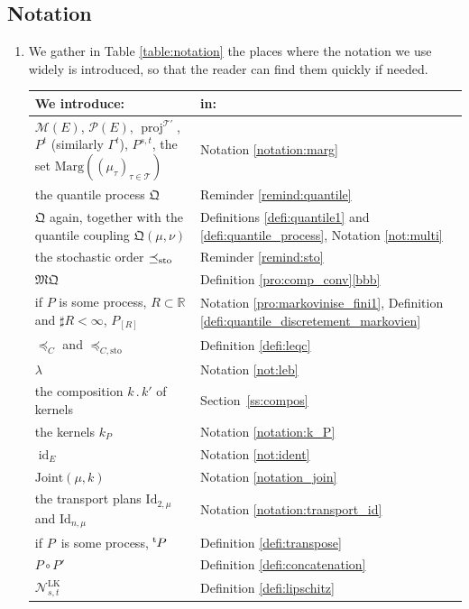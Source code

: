 \documentclass[11pt]{article}
\newcommand{\Subsection}{\subsection}
\newcommand{\ldot}{\mathbin{.}}
\theoremstyle{plain}
\theoremstyle{definition}
\newcommand{\id}{\mathrm{Id}}
\newcommand{\join}{\mathrm{Joint}}
\newcommand{\como}{\mathfrak{Q}}
\newcommand{\mq}{\mathfrak{MQ}}
\newcommand{\ML}{\mathrm{LK}}
\newcommand{\idk}{\operatorname{id}}
\newcommand{\Tt}{{\mathcal T}}
\let\mb\relax
\let\mn\relax
\newcommand{\trans}{{}^{\mathrm{t}}\mkern-1mu}
\newcommand{\la}{\lambda}
\newcommand{\p}{\mathcal{P}}
\newcommand{\m}{\mathcal{M}}
\newcommand{\ma}{\mathrm{Marg}}
\newcommand{\R}{\mathbb{R}}
\newcommand{\sto}{\mathrm{sto}}
\newcommand{\leqc}{\preceq_{C}}
\newcommand{\leqcs}{\preceq_{C,\sto}}
\newcommand{\leqs}{\preceq_{\text{\rm sto}}}
\newcommand{\pr}{\operatorname{proj}}
\begin{document}
\Subsection{Notation}\label{subsec:notation}
\begin{enumerate}
\item
We gather in Table \ref{table:notation} the places where the notation we use widely is introduced, so that the reader can find them quickly if needed.

\begin{table}[htb]\renewcommand{\arraystretch}{1.2}
\mb\scriptsize\hspace*{\fill}\begin{tabular}{|p{}|l|}\hline
We introduce: &in:\\\hline
$\m(E)$, $\p(E)$, $\pr^{\Tt'}$, $P^t$ (similarly $\Gamma^t$), $P^{s,t}$, the set $\ma((\mu_\tau)_{\tau\in\Tt})$ & Notation \ref{notation:marg}\\\hline
the quantile process $\como$ & Reminder \ref{remind:quantile}\\\hline
$\como$ again, together with the quantile coupling $\como(\mu,\nu)$ & Definitions \ref{defi:quantile1} and \ref{defi:quantile_process}, Notation \ref{not:multi}\\\hline
the stochastic order $\leqs$ & Reminder \ref{remind:sto}\\\hline
$\mq$ & Definition \ref{pro:comp_conv}\eqref{bbb}\\\hline
if \mn$P$ is some process, $R\subset\R$ and $\sharp R<\infty$\mb, $P_{[R]}$ & Notation \ref{pro:markovinise_fini1}, Definition \ref{defi:quantile_discretement_markovien}\\\hline
$\leqc$ and $\leqcs$ & Definition \ref{defi:leqc}\\\hline
$\la$ & Notation \ref{not:leb}\\\hline
the composition $k\ldot k'$ of kernels & Section~\ref{ss:compos}\\\hline
the kernels $k_P$ & Notation \ref{notation:k_P}\\\hline
$\idk_E$ & Notation \ref{not:ident}\\\hline
$\join(\mu,k)$ & Notation \ref{notation_join}\\\hline
the transport plans $\id_{2,\mu}$ and $\id_{n,\mu}$ & Notation \ref{notation:transport_id}\\\hline
if \mn$P$\mb\ is some process, $\trans P$ & Definition \ref{defi:transpose}\\\hline
$P\circ P'$ & Definition \ref{defi:concatenation}\\\hline
$\mathcal{N}^\ML_{s,t}$ & Definition \ref{defi:lipschitz}\\\hline

\end{tabular}
\end{table}
\end{enumerate}
\end{document}
